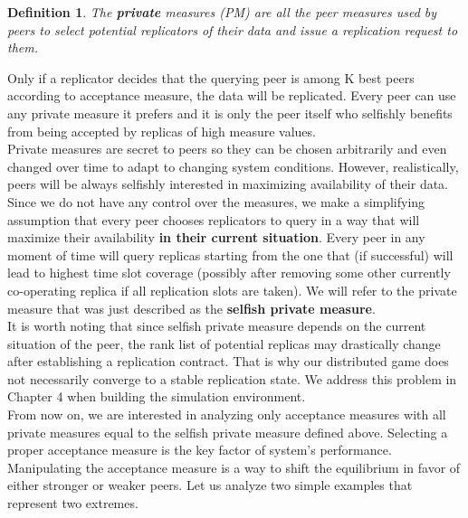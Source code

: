 \documentclass{pracamgren}
\newcounter{collective_ctr} \numberwithin{collective_ctr}{chapter}
\newtheorem{definition}[collective_ctr]{Definition}
\begin{document}
\begin{definition}
The {\bf private} measures (PM) are all the peer measures used by peers to select potential replicators of their data and issue a replication request to them.
\end{definition}

Only if a replicator decides that the querying peer is among K best peers according to acceptance measure, the data will be replicated. Every peer can use any private measure it prefers and it is only the peer itself who selfishly benefits from being accepted by replicas of high measure values.\\

Private measures are secret to peers so they can be chosen arbitrarily and even changed over time to adapt to changing system conditions. However, realistically, peers will be always selfishly interested in maximizing availability of their data. Since we do not have any control over the measures, we make a simplifying assumption that every peer chooses replicators to query in a way that will maximize their availability {\bf in their current situation}. Every peer in any moment of time will query replicas starting from the one that (if successful) will lead to highest time slot coverage (possibly after removing some other currently co-operating replica if all replication slots are taken). We will refer to the private measure that was just described as the {\bf selfish private measure}.\\

It is worth noting that since selfish private measure depends on the current situation of the peer, the rank list of potential replicas may drastically change after establishing a replication contract. That is why our distributed game does not necessarily converge to a stable replication state. We address this problem in Chapter 4 when building the simulation environment.\\

From now on, we are interested in analyzing only acceptance measures with all private measures equal to the selfish private measure defined above. Selecting a proper acceptance measure is the key factor of system's performance. Manipulating the acceptance measure is a way to shift the equilibrium in favor of either stronger or weaker peers. Let us analyze two simple examples that represent two extremes.\\

\end{document}
